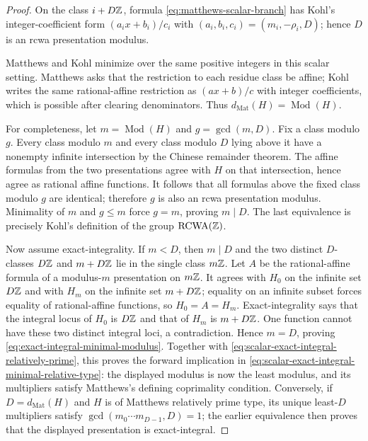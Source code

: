\begin{proof}
On the class $i+D\mathbb Z$, formula
\cref{eq:matthews-scalar-branch} has Kohl's integer-coefficient form
$(a_i x+b_i)/c_i$ with $(a_i,b_i,c_i)=(m_i,-\rho_i,D)$; hence $D$ is an
rcwa presentation modulus.

Matthews and Kohl minimize over the same positive integers in this scalar
setting.  Matthews asks that the restriction to each residue class be affine;
Kohl writes the same rational-affine restriction as $(ax+b)/c$ with integer
coefficients, which is possible after clearing denominators.  Thus
$d_{\mathrm{Mat}}(H)=\operatorname{Mod}(H)$.

For completeness, let $m=\operatorname{Mod}(H)$ and
$g=\gcd(m,D)$.  Fix a class modulo $g$.  Every class modulo $m$ and every
class modulo $D$ lying above it have a nonempty infinite intersection by the
Chinese remainder theorem.  The affine formulas from the two presentations
agree with $H$ on that intersection, hence agree as rational affine functions.
It follows that all formulas above the fixed class modulo $g$ are identical;
therefore $g$ is also an rcwa presentation modulus.  Minimality of $m$ and
$g\leq m$ force $g=m$, proving $m\mid D$.  The last equivalence is precisely
Kohl's definition of the group $\operatorname{RCWA}(\mathbb Z)$.

Now assume exact-integrality.  If $m<D$, then $m\mid D$ and the two distinct
$D$-classes $D\mathbb Z$ and $m+D\mathbb Z$ lie in the single class $m\mathbb Z$.  Let $A$ be the
rational-affine formula of a modulus-$m$ presentation on $m\mathbb Z$.  It agrees
with $H_0$ on the infinite set $D\mathbb Z$ and with $H_m$ on the infinite set
$m+D\mathbb Z$; equality on an infinite subset forces equality of rational-affine
functions, so $H_0=A=H_m$.  Exact-integrality says that the integral locus of
$H_0$ is $D\mathbb Z$ and that of $H_m$ is $m+D\mathbb Z$.  One function cannot have these
two distinct integral loci, a contradiction.  Hence $m=D$, proving
\cref{eq:exact-integral-minimal-modulus}.  Together with
\cref{eq:scalar-exact-integral-relatively-prime}, this proves the forward
implication in
\cref{eq:scalar-exact-integral-minimal-relative-type}: the displayed modulus
is now the least modulus, and its multipliers satisfy Matthews's defining
coprimality condition.  Conversely, if $D=d_{\mathrm{Mat}}(H)$ and $H$ is of
Matthews relatively prime type, its unique least-$D$ multipliers satisfy
$\gcd(m_0\cdots m_{D-1},D)=1$; the earlier equivalence then proves that the
displayed presentation is exact-integral.
\end{proof}

